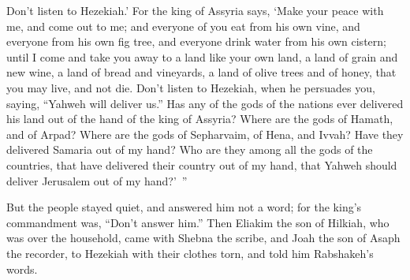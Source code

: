 {Don’t listen to Hezekiah.’ For the king of Assyria says, ‘Make your peace with me, and come out to me; and everyone of you eat from his own vine, and everyone from his own fig tree, and everyone drink water from his own cistern;
until I come and take you away to a land like your own land, a land of grain and new wine, a land of bread and vineyards, a land of olive trees and of honey, that you may live, and not die. Don’t listen to Hezekiah, when he persuades you, saying, “Yahweh will deliver us.”
Has any of the gods of the nations ever delivered his land out of the hand of the king of Assyria?
Where are the gods of Hamath, and of Arpad? Where are the gods of Sepharvaim, of Hena, and Ivvah? Have they delivered Samaria out of my hand?
Who are they among all the gods of the countries, that have delivered their country out of my hand, that Yahweh should deliver Jerusalem out of my hand?’ ”
\par }{\PP {}But the people stayed quiet, and answered him not a word; for the king’s commandment was, “Don’t answer him.”
Then Eliakim the son of Hilkiah, who was over the household, came with Shebna the scribe, and Joah the son of Asaph the recorder, to Hezekiah with their clothes torn, and told him Rabshakeh’s words.

}
